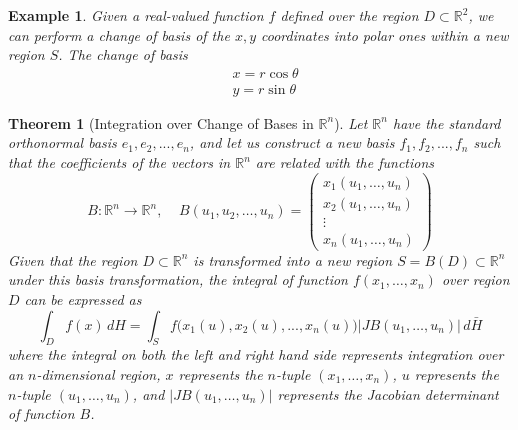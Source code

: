 \documentclass{article}
\newtheorem{theorem}{Theorem}[section]
\newtheorem{example}{Example}[section]
\theoremstyle{remark}
\theoremstyle{definition}
\begin{document}
\begin{example}
Given a real-valued function $f$ defined over the region $D \subset \mathbb{R}^2$, we can perform a change of basis of the $x, y$ coordinates into polar ones within a new region $S$. The change of basis 
\begin{align*}
    & x = r \cos{\theta} \\
    & y = r \sin{\theta} 
\end{align*}
\begin{center}
\end{center}
\end{example}

\begin{theorem}[Integration over Change of Bases in $\mathbb{R}^n$]
Let $\mathbb{R}^n$ have the standard orthonormal basis $e_1, e_2, ..., e_n$, and let us construct a new basis $f_1, f_2, ..., f_n$ such that the coefficients of the vectors in $\mathbb{R}^n$ are related with the functions
\[B: \mathbb{R}^n \longrightarrow \mathbb{R}^n, \;\;\;\; B(u_1, u_2, \ldots, u_n) = \begin{pmatrix}
x_1 (u_1, \ldots, u_n) \\x_2 (u_1, \ldots, u_n) \\ \vdots \\ x_n (u_1, \ldots, u_n)
\end{pmatrix}\]
Given that the region $D \subset \mathbb{R}^n$ is transformed into a new region $S = B(D) \subset \mathbb{R}^n$ under this basis transformation, the integral of function $f(x_1, \ldots, x_n)$ over region $D$ can be expressed as 
\[\int_D f(x) \, dH = \int_S f \big( x_1(u), x_2(u), ..., x_n (u) \big) \big| J B(u_1, \ldots, u_n)\big| \, d \bar{H}\]
where the integral on both the left and right hand side represents integration over an $n$-dimensional region, $x$ represents the $n$-tuple $(x_1, \ldots, x_n)$, $u$ represents the $n$-tuple $(u_1, \ldots, u_n)$, and $\big| J B(u_1, \ldots, u_n)\big|$ represents the Jacobian determinant of function $B$. 
\end{theorem}
\end{document}
